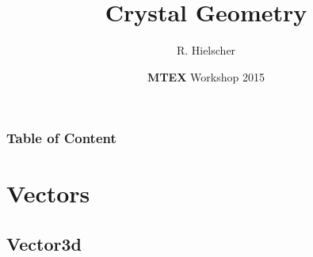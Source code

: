 \documentclass[compress]{beamer}
\author{R. Hielscher}
\title{Crystal Geometry}
\institute{Faculty of Mathematics,\\
	Chemnitz University of Technology, Germany}
\date{{\bf{\color{red}M}TEX} Workshop 2015}
\begin{document}
\begin{frame}
  \maketitle{}
\end{frame}

\begin{frame}
  \frametitle{Table of Content}

\tableofcontents{}

\end{frame}


\section{Vectors}

\subsection*{Vector3d}
\end{document}
